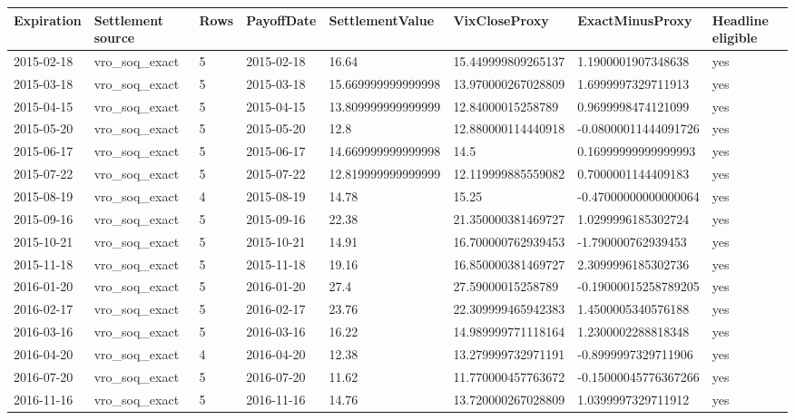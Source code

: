 \begin{tabular}{llllllll}
\toprule
Expiration & Settlement source & Rows & PayoffDate & SettlementValue & VixCloseProxy & ExactMinusProxy & Headline eligible \\
\midrule
2015-02-18 & vro\_soq\_exact & 5 & 2015-02-18 & 16.64 & 15.449999809265137 & 1.1900001907348638 & yes \\
2015-03-18 & vro\_soq\_exact & 5 & 2015-03-18 & 15.669999999999998 & 13.970000267028809 & 1.6999997329711913 & yes \\
2015-04-15 & vro\_soq\_exact & 5 & 2015-04-15 & 13.809999999999999 & 12.84000015258789 & 0.9699998474121099 & yes \\
2015-05-20 & vro\_soq\_exact & 5 & 2015-05-20 & 12.8 & 12.880000114440918 & -0.08000011444091726 & yes \\
2015-06-17 & vro\_soq\_exact & 5 & 2015-06-17 & 14.669999999999998 & 14.5 & 0.16999999999999993 & yes \\
2015-07-22 & vro\_soq\_exact & 5 & 2015-07-22 & 12.819999999999999 & 12.119999885559082 & 0.7000001144409183 & yes \\
2015-08-19 & vro\_soq\_exact & 4 & 2015-08-19 & 14.78 & 15.25 & -0.47000000000000064 & yes \\
2015-09-16 & vro\_soq\_exact & 5 & 2015-09-16 & 22.38 & 21.350000381469727 & 1.0299996185302724 & yes \\
2015-10-21 & vro\_soq\_exact & 5 & 2015-10-21 & 14.91 & 16.700000762939453 & -1.790000762939453 & yes \\
2015-11-18 & vro\_soq\_exact & 5 & 2015-11-18 & 19.16 & 16.850000381469727 & 2.3099996185302736 & yes \\
2016-01-20 & vro\_soq\_exact & 5 & 2016-01-20 & 27.4 & 27.59000015258789 & -0.19000015258789205 & yes \\
2016-02-17 & vro\_soq\_exact & 5 & 2016-02-17 & 23.76 & 22.309999465942383 & 1.4500005340576188 & yes \\
2016-03-16 & vro\_soq\_exact & 5 & 2016-03-16 & 16.22 & 14.989999771118164 & 1.2300002288818348 & yes \\
2016-04-20 & vro\_soq\_exact & 4 & 2016-04-20 & 12.38 & 13.279999732971191 & -0.8999997329711906 & yes \\
2016-07-20 & vro\_soq\_exact & 5 & 2016-07-20 & 11.62 & 11.770000457763672 & -0.15000045776367266 & yes \\
2016-11-16 & vro\_soq\_exact & 5 & 2016-11-16 & 14.76 & 13.720000267028809 & 1.0399997329711912 & yes \\

\end{tabular}
